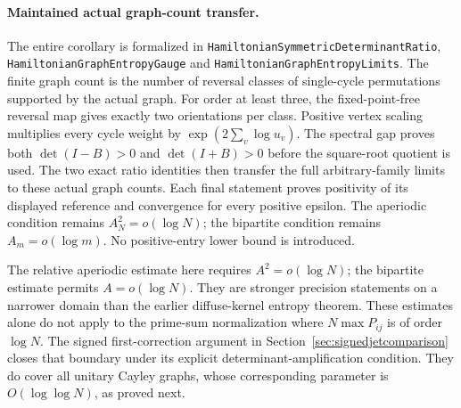 \paragraph{Maintained actual graph-count transfer.}
The entire corollary is formalized in
\texttt{HamiltonianSymmetricDeterminantRatio},
\texttt{HamiltonianGraphEntropyGauge} and
\texttt{HamiltonianGraphEntropyLimits}.
The finite graph count is the number of reversal classes of
single-cycle permutations supported by the actual graph.
For order at least three, the fixed-point-free reversal map
gives exactly two orientations per class.
Positive vertex scaling multiplies every cycle weight by
\(\exp(2\sum_v\log u_v)\).
The spectral gap proves both \(\det(I-B)>0\) and
\(\det(I+B)>0\) before the square-root quotient is used.
The two exact ratio identities then transfer the full
arbitrary-family limits to these actual graph counts.
Each final statement proves positivity of its displayed
reference and convergence for every positive epsilon.
The aperiodic condition remains \(A_N^2=o(\log N)\);
the bipartite condition remains \(A_m=o(\log m)\).
No positive-entry lower bound is introduced.

\begin{remark}
The relative aperiodic estimate here requires \(A^2=o(\log N)\);
the bipartite estimate permits \(A=o(\log N)\).
They are stronger precision statements on a narrower domain
than the earlier diffuse-kernel entropy theorem.
These estimates alone do not apply to the prime-sum
normalization where \(N\max P_{ij}\) is of order \(\log N\).
The signed first-correction argument in
Section~\ref{sec:signedjetcomparison} closes that boundary
under its explicit determinant-amplification condition.
They do cover all unitary Cayley graphs, whose corresponding
parameter is \(O(\log\log N)\), as proved next.
\end{remark}
